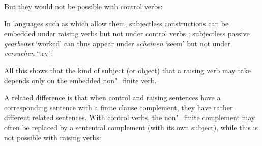 \noindent
But they would not be possible with control verbs:
\eal
{}
\zl

In languages such as  which allow them, subjectless constructions can be embedded under
raising verbs but not under control verbs \citep[]{Mueller2002b}; subjectless passive
\emph{gearbeitet} `worked' can thus appear under \emph{scheinen} `seem' but not under
\emph{versuchen} `try': 

\eal
\label{german1}\label{ex-raising-with-subjectless-verbs}
\zl
 
\noindent
All this shows that the kind of subject (or object) that a raising verb may take depends only on the embedded
non"=finite verb.

A related difference is that when control and raising sentences have a corresponding sentence with a finite clause complement, they have rather different related sentences.
With control verbs, the non"=finite complement may often be replaced by a sentential complement (with its own subject), while this is not possible with raising verbs:

\eal
{}
\zl

\eal
{}
\zl

